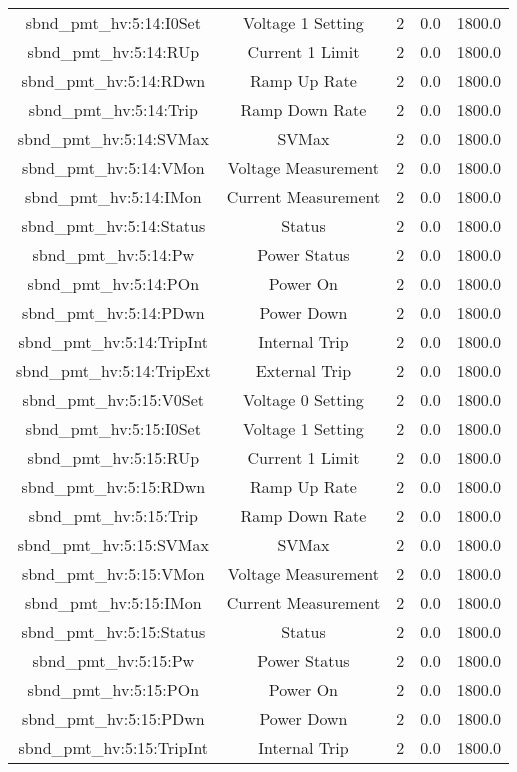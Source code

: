 \begin{center}
\begin{longtable}{c | c c c c }
sbnd\_pmt\_hv:5:14:I0Set & Voltage 1 Setting & 2 & 0.0 & 1800.0\\ 
sbnd\_pmt\_hv:5:14:RUp & Current 1 Limit & 2 & 0.0 & 1800.0\\ 
sbnd\_pmt\_hv:5:14:RDwn & Ramp Up Rate & 2 & 0.0 & 1800.0\\ 
sbnd\_pmt\_hv:5:14:Trip & Ramp Down Rate & 2 & 0.0 & 1800.0\\ 
sbnd\_pmt\_hv:5:14:SVMax & SVMax & 2 & 0.0 & 1800.0\\ 
sbnd\_pmt\_hv:5:14:VMon & Voltage Measurement & 2 & 0.0 & 1800.0\\ 
sbnd\_pmt\_hv:5:14:IMon & Current Measurement & 2 & 0.0 & 1800.0\\ 
sbnd\_pmt\_hv:5:14:Status & Status & 2 & 0.0 & 1800.0\\ 
sbnd\_pmt\_hv:5:14:Pw & Power Status & 2 & 0.0 & 1800.0\\ 
sbnd\_pmt\_hv:5:14:POn & Power On & 2 & 0.0 & 1800.0\\ 
sbnd\_pmt\_hv:5:14:PDwn & Power Down & 2 & 0.0 & 1800.0\\ 
sbnd\_pmt\_hv:5:14:TripInt & Internal Trip & 2 & 0.0 & 1800.0\\ 
sbnd\_pmt\_hv:5:14:TripExt & External Trip & 2 & 0.0 & 1800.0\\ 
sbnd\_pmt\_hv:5:15:V0Set & Voltage 0 Setting & 2 & 0.0 & 1800.0\\ 
sbnd\_pmt\_hv:5:15:I0Set & Voltage 1 Setting & 2 & 0.0 & 1800.0\\ 
sbnd\_pmt\_hv:5:15:RUp & Current 1 Limit & 2 & 0.0 & 1800.0\\ 
sbnd\_pmt\_hv:5:15:RDwn & Ramp Up Rate & 2 & 0.0 & 1800.0\\ 
sbnd\_pmt\_hv:5:15:Trip & Ramp Down Rate & 2 & 0.0 & 1800.0\\ 
sbnd\_pmt\_hv:5:15:SVMax & SVMax & 2 & 0.0 & 1800.0\\ 
sbnd\_pmt\_hv:5:15:VMon & Voltage Measurement & 2 & 0.0 & 1800.0\\ 
sbnd\_pmt\_hv:5:15:IMon & Current Measurement & 2 & 0.0 & 1800.0\\ 
sbnd\_pmt\_hv:5:15:Status & Status & 2 & 0.0 & 1800.0\\ 
sbnd\_pmt\_hv:5:15:Pw & Power Status & 2 & 0.0 & 1800.0\\ 
sbnd\_pmt\_hv:5:15:POn & Power On & 2 & 0.0 & 1800.0\\ 
sbnd\_pmt\_hv:5:15:PDwn & Power Down & 2 & 0.0 & 1800.0\\ 
sbnd\_pmt\_hv:5:15:TripInt & Internal Trip & 2 & 0.0 & 1800.0\\ 

\end{longtable}
\end{center}
